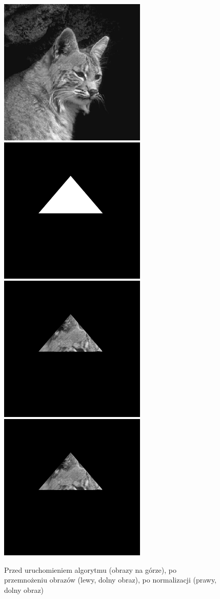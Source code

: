 \documentclass[a4paper,12pt]{book}
\begin{document}
\begin{figure}[H]
\caption{Przed uruchomieniem algorytmu (obrazy na górze), po przemnożeniu obrazów (lewy, dolny obraz), po normalizacji (prawy, dolny obraz)}
\includegraphics[width=7cm, height=7cm]{cat-unmodified.jpg}
\includegraphics[width=7cm, height=7cm]{mask-unmodified.png}
\includegraphics[width=7cm, height=7cm]{2/multiply-gray-images-mask.png}
\includegraphics[width=7cm, height=7cm]{2/multiply-gray-images-mask.png}
\end{figure}
\end{document}
